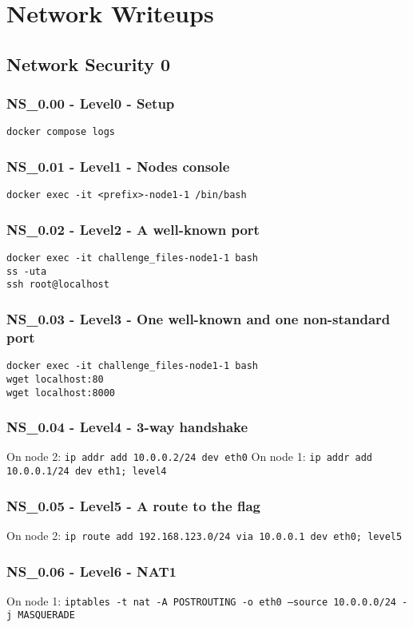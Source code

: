 \chapter{Network Writeups}

\section{Network Security 0}
\subsection{NS_0.00 - Level0 - Setup}
\texttt{docker compose logs}

\subsection{NS_0.01 - Level1 - Nodes console}
\texttt{docker exec -it <prefix>-node1-1 /bin/bash}

\subsection{NS_0.02 - Level2 - A well-known port}
\begin{verbatim}
docker exec -it challenge_files-node1-1 bash
ss -uta
ssh root@localhost
\end{verbatim}

\subsection{NS_0.03 - Level3 - One well-known and one non-standard port}
\begin{verbatim}
docker exec -it challenge_files-node1-1 bash
wget localhost:80
wget localhost:8000
\end{verbatim}

\subsection{NS_0.04 - Level4 - 3-way handshake}
On node 2: \texttt{ip addr add 10.0.0.2/24 dev eth0}
On node 1: \texttt{ip addr add 10.0.0.1/24 dev eth1; level4}

\subsection{NS_0.05 - Level5 - A route to the flag}
On node 2: \texttt{ip route add 192.168.123.0/24 via 10.0.0.1 dev eth0; level5}

\subsection{NS_0.06 - Level6 - NAT1}
On node 1: \texttt{iptables -t nat -A POSTROUTING -o eth0 --source 10.0.0.0/24 -j MASQUERADE}

